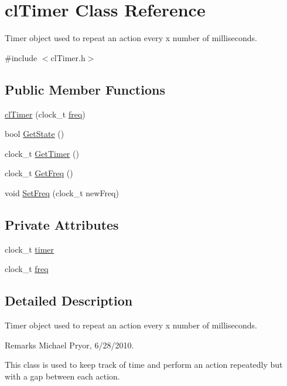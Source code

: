 \hypertarget{classcl_timer}{
\section{clTimer Class Reference}
\label{classcl_timer}
}


Timer object used to repeat an action every x number of milliseconds.  




{\ttfamily \#include $<$clTimer.h$>$}

\subsection*{Public Member Functions}
\begin{DoxyCompactItemize}
\item 
\hyperlink{classcl_timer_a72ef68b5b8a411d751337ba10ec23adc}{clTimer} (clock\_\-t \hyperlink{classcl_timer_a72b7305f6dcd12bbf782fc9fbbc68b4e}{freq})
\item 
bool \hyperlink{classcl_timer_a8164ec7e5e0ca6223cfbaf13ebd51b63}{GetState} ()
\item 
clock\_\-t \hyperlink{classcl_timer_a7c836ada48d28b1a398d2decbc76d4d3}{GetTimer} ()
\item 
clock\_\-t \hyperlink{classcl_timer_a4fbf6aa5b46917ce1e4be162a1332fbe}{GetFreq} ()
\item 
void \hyperlink{classcl_timer_a93cdf6a3159deedd1c1209846634b768}{SetFreq} (clock\_\-t newFreq)
\end{DoxyCompactItemize}
\subsection*{Private Attributes}
\begin{DoxyCompactItemize}
\item 
clock\_\-t \hyperlink{classcl_timer_a8c93f49afaed2dc361b11bd8d0edff1f}{timer}
\item 
clock\_\-t \hyperlink{classcl_timer_a72b7305f6dcd12bbf782fc9fbbc68b4e}{freq}
\end{DoxyCompactItemize}


\subsection{Detailed Description}
Timer object used to repeat an action every x number of milliseconds. \begin{DoxyRemark}{Remarks}
Michael Pryor, 6/28/2010.
\end{DoxyRemark}
This class is used to keep track of time and perform an action repeatedly but with a gap between each action. \par
\par


